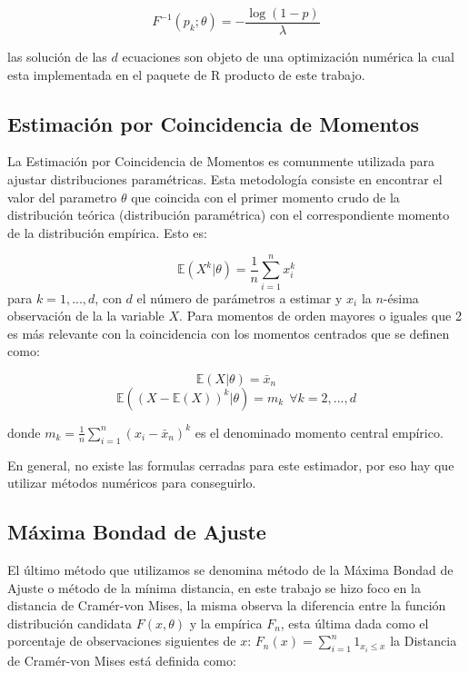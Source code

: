 \documentclass[]{article}
\begin{document}
\[F^{-1}(p_k;\theta)=-\frac{\log(1-p)}{\lambda}\]

las solución de las \(d\) ecuaciones son objeto de una optimización
numérica la cual esta implementada en el paquete de R producto de este
trabajo.

\hypertarget{estimacion-por-coincidencia-de-momentos}{%
\subsection{Estimación por Coincidencia de
Momentos}\label{estimacion-por-coincidencia-de-momentos}}

La Estimación por Coincidencia de Momentos es comunmente utilizada para
ajustar distribuciones paramétricas. Esta metodología consiste en
encontrar el valor del parametro \(\theta\) que coincida con el primer
momento crudo de la distribución teórica (distribución paramétrica) con
el correspondiente momento de la distribución empírica. Esto es:

\[\mathbb{E}(X^{k}|\theta)=\frac{1}{n}\sum_{i=1}^{n}x_{i}^{k}\] para
\(k=1,...,d\), con \(d\) el número de parámetros a estimar y \(x_i\) la
\(n\)-ésima observación de la la variable \(X\). Para momentos de orden
mayores o iguales que 2 es más relevante con la coincidencia con los
momentos centrados que se definen como:

\[\mathbb{E}(X|\theta)=\bar{x}_{n}\]
\[\mathbb{E}((X-\mathbb{E}(X))^{k}|\theta)=m_k~~\forall k=2,...,d\]

donde \(m_k=\frac{1}{n}\sum_{i=1}^{n}(x_i-\bar{x}_n)^k\) es el
denominado momento central empírico.

En general, no existe las formulas cerradas para este estimador, por eso
hay que utilizar métodos numéricos para conseguirlo.

\hypertarget{maxima-bondad-de-ajuste}{%
\subsection{Máxima Bondad de Ajuste}\label{maxima-bondad-de-ajuste}}

El último método que utilizamos se denomina método de la Máxima Bondad
de Ajuste o método de la mínima distancia, en este trabajo se hizo foco
en la distancia de Cramér-von Mises, la misma observa la diferencia
entre la función distribución candidata \(F(x,\theta)\) y la empírica
\(F_n\), esta última dada como el porcentaje de observaciones siguientes
de \(x\): \(F_n(x)=\sum_{i=1}^{n}1_{x_i\leq x}\) la Distancia de
Cramér-von Mises está definida como:
\end{document}
